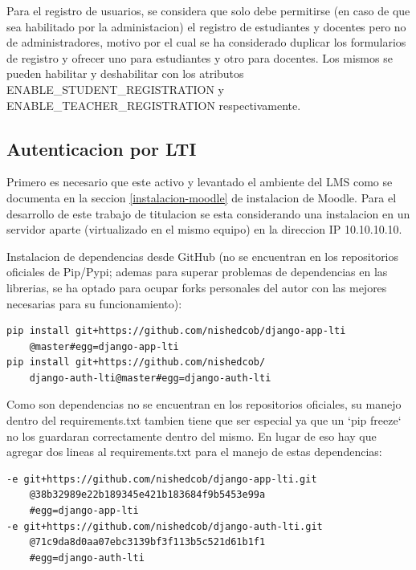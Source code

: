 Para el registro de usuarios, se considera que solo debe permitirse (en caso de que sea habilitado por la administacion) el registro de estudiantes y docentes pero no de administradores, motivo por el cual se ha considerado duplicar los formularios de registro y ofrecer uno para estudiantes y otro para docentes. Los mismos se pueden habilitar y deshabilitar con los atributos ENABLE\_STUDENT\_REGISTRATION y ENABLE\_TEACHER\_REGISTRATION respectivamente.

\subsection{Autenticacion por LTI}

Primero es necesario que este activo y levantado el ambiente del LMS como se documenta en la seccion \ref{instalacion-moodle} de instalacion de Moodle. Para el desarrollo de este trabajo de titulacion se esta considerando una instalacion en un servidor aparte (virtualizado en el mismo equipo) en la direccion IP 10.10.10.10.


Instalacion de dependencias desde GitHub (no se encuentran en los repositorios oficiales de Pip/Pypi; ademas para superar problemas de dependencias en las librerias, se ha optado para ocupar forks personales del autor con las mejores necesarias para su funcionamiento):
\begin{lstlisting}
pip install git+https://github.com/nishedcob/django-app-lti
    @master#egg=django-app-lti
pip install git+https://github.com/nishedcob/
    django-auth-lti@master#egg=django-auth-lti
\end{lstlisting}

Como son dependencias no se encuentran en los repositorios oficiales, su manejo dentro del requirements.txt tambien tiene que ser especial ya que un `pip freeze` no los guardaran correctamente dentro del mismo. En lugar de eso hay que agregar dos lineas al requirements.txt para el manejo de estas dependencias:
\begin{lstlisting}
-e git+https://github.com/nishedcob/django-app-lti.git
    @38b32989e22b189345e421b183684f9b5453e99a
    #egg=django-app-lti
-e git+https://github.com/nishedcob/django-auth-lti.git
    @71c9da8d0aa07ebc3139bf3f113b5c521d61b1f1
    #egg=django-auth-lti
\end{lstlisting}


\lstset{language=Python}

